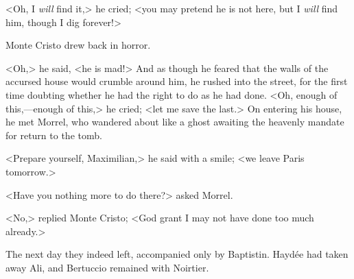  <Oh, I \textit{will} find it,> he cried; <you may pretend he is not here, but I \textit{will} find him, though I dig forever!> 

 Monte Cristo drew back in horror. 

 <Oh,> he said, <he is mad!> And as though he feared that the walls of the accursed house would crumble around him, he rushed into the street, for the first time doubting whether he had the right to do as he had done. <Oh, enough of this,—enough of this,> he cried; <let me save the last.> On entering his house, he met Morrel, who wandered about like a ghost awaiting the heavenly mandate for return to the tomb. 

 <Prepare yourself, Maximilian,> he said with a smile; <we leave Paris tomorrow.> 

 <Have you nothing more to do there?> asked Morrel. 

 <No,> replied Monte Cristo; <God grant I may not have done too much already.> 

 The next day they indeed left, accompanied only by Baptistin. Haydée had taken away Ali, and Bertuccio remained with Noirtier. 